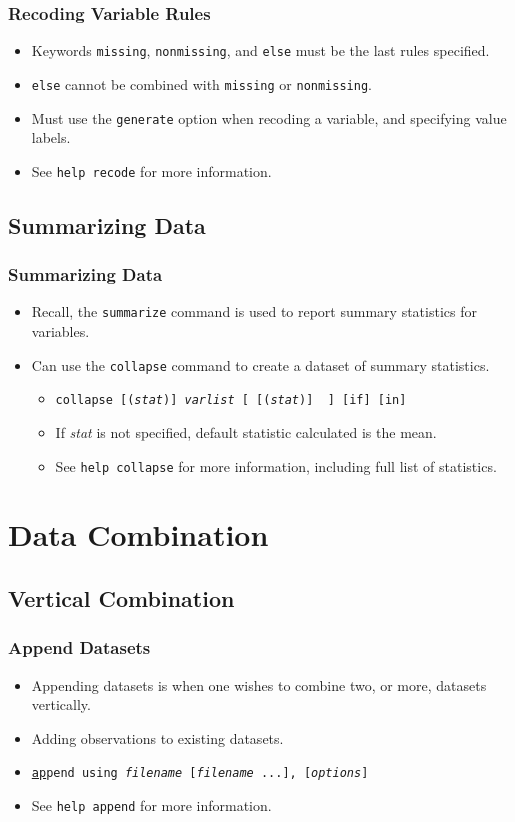 \documentclass{beamer}
\begin{document}
\begin{frame}
	\frametitle{Recoding Variable Rules}
		\begin{itemize}
			\item Keywords \texttt{missing}, \texttt{nonmissing}, and \texttt{else} must be the last rules specified.
			\item \texttt{else} cannot be combined with \texttt{missing} or \texttt{nonmissing}.
			\item Must use the \texttt{generate} option when recoding a variable, and specifying value labels.
			\item See \texttt{help recode} for more information.
		\end{itemize}
\end{frame}

\subsection{Summarizing Data}

\begin{frame}
	\frametitle{Summarizing Data}
		\begin{itemize}
			\item Recall, the \texttt{summarize} command is used to report summary statistics for variables.
			\item Can use the \texttt{collapse} command to create a dataset of summary statistics.
				\begin{itemize}
					\item \texttt{collapse [(\textit{stat})] \textit{varlist} [ [(\textit{stat})] \textellipsis~] [if] [in]}
					\item If \textit{stat} is not specified, default statistic calculated is the mean.
					\item See \texttt{help collapse} for more information, including full list of statistics.
				\end{itemize}
		\end{itemize}
\end{frame}

\section{Data Combination}
\subsection{Vertical Combination}

\begin{frame}
	\frametitle{Append Datasets}
		\begin{itemize}
			\item Appending datasets is when one wishes to combine two, or more, datasets vertically.
			\item Adding observations to existing datasets.
			\item \texttt{\underline{ap}pend using \textit{filename} [\textit{filename} ...], [\textit{options}]}
			\item See \texttt{help append} for more information.
		\end{itemize}
\end{frame}
\end{document}
